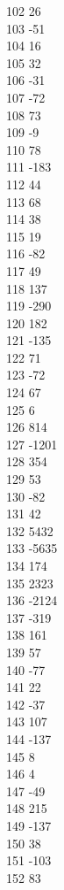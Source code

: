 { 102	26 \\
 103	-51 \\
 104	16 \\
 105	32 \\
 106	-31 \\
 107	-72 \\
 108	73 \\
 109	-9 \\
 110	78 \\
 111	-183 \\
 112	44 \\
 113	68 \\
 114	38 \\
 115	19 \\
 116	-82 \\
 117	49 \\
 118	137 \\
 119	-290 \\
 120	182 \\
 121	-135 \\
 122	71 \\
 123	-72 \\
 124	67 \\
 125	6 \\
 126	814 \\
 127	-1201 \\
 128	354 \\
 129	53 \\
 130	-82 \\
 131	42 \\
 132	5432 \\
 133	-5635 \\
 134	174 \\
 135	2323 \\
 136	-2124 \\
 137	-319 \\
 138	161 \\
 139	57 \\
 140	-77 \\
 141	22 \\
 142	-37 \\
 143	107 \\
 144	-137 \\
 145	8 \\
 146	4 \\
 147	-49 \\
 148	215 \\
 149	-137 \\
 150	38 \\
 151	-103 \\
 152	83 \\
}
